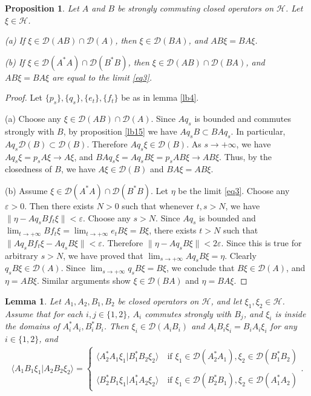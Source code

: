 \documentclass[11pt,b5paper,notitlepage]{article}
\theoremstyle{definition}
\theoremstyle{plain}
\newtheorem{pp}[df]{Proposition}
\newtheorem{lm}[df]{Lemma}
\newcommand{\mc}{\mathcal}
\newcommand{\Dom}{\scr D}
\newcommand{\bk}[1]{\langle {#1}\rangle}
\newcommand{\scr}{\mathscr}
\numberwithin{equation}{subsection}
\begin{document}
\begin{subappendices}
\begin{pp}\label{lb3}
	Let $A$ and $B$ be strongly commuting closed operators on $\mc H$. Let $\xi\in\mc H$.
	
	(a) If $\xi\in\Dom(AB)\cap\Dom(A)$, then $\xi\in\Dom(BA)$, and $AB\xi=BA\xi$.
	
	(b) If $\xi\in\Dom(A^*A)\cap\Dom(B^*B)$, then $\xi\in\Dom(AB)\cap\Dom(BA)$, and $AB\xi=BA\xi$ are equal to the limit \eqref{eq3}.
\end{pp}


\begin{proof}
	Let $\{p_s\},\{q_s\},\{e_t\},\{f_t\}$ be as in lemma \ref{lb4}. 
	
	(a) Choose any $\xi\in\Dom(AB)\cap\Dom(A)$. Since $Aq_s$ is bounded and commutes strongly with $B$, by proposition \ref{lb15} we have $Aq_sB\subset BAq_s$. In particular, $Aq_s\Dom(B)\subset\Dom(B)$. Therefore $Aq_s\xi\in\Dom(B)$. As $s\rightarrow+\infty$, we have $Aq_s\xi=p_sA\xi\rightarrow A\xi$, and $BAq_s\xi=Aq_sB\xi=p_sAB\xi\rightarrow AB\xi$. Thus, by the closedness of $B$, we have $A\xi\in\Dom(B)$ and $BA\xi=AB\xi$.
	
	(b) Assume $\xi\in\Dom(A^*A)\cap\Dom(B^*B)$. Let $\eta$ be the limit \eqref{eq3}. Choose any $\varepsilon>0$. Then there exists $N>0$ such that whenever $t,s>N$, we have  $\lVert \eta-Aq_sBf_t\xi\lVert<\varepsilon$. Choose any $s>N$. Since $Aq_s$ is bounded and $\lim_{t\rightarrow+\infty}Bf_t\xi=\lim_{t\rightarrow+\infty}e_tB\xi=B\xi$, there exists $t>N$ such that $\lVert Aq_sBf_t\xi-Aq_sB\xi\lVert<\varepsilon$. Therefore $\lVert \eta-Aq_sB\xi\lVert<2\varepsilon$. Since this is true for arbitrary $s>N$, we have proved that $\lim_{s\rightarrow+\infty}Aq_sB\xi=\eta$. Clearly $q_sB\xi\in\Dom(A)$. Since $\lim_{s\rightarrow+\infty}q_sB\xi=B\xi$, we conclude that $B\xi\in\Dom(A)$,  and $\eta=AB\xi$. Similar arguments show $\xi\in\Dom(BA)$ and $\eta=BA\xi$.
\end{proof}

\begin{lm}\label{lb14}
	Let $A_1,A_2,B_1,B_2$ be closed operators on $\mc H$, and let $\xi_1,\xi_2\in\mc H$. Assume that for each $i,j\in\{1,2\}$, $A_i$ commutes strongly with $B_j$, and  $\xi_i$ is inside the domains of $A_i^*A_i,B_i^*B_i$. Then  $\xi_i\in\Dom(A_iB_i)$ and  $A_iB_i\xi_i=B_iA_i\xi_i$ for any $i\in\{1,2\}$, and
	\begin{align}
	\bk{A_1B_1\xi_1|A_2B_2\xi_2}=\left\{ \begin{array}{ll}
	\bk{A_2^*A_1\xi_1|B_1^*B_2\xi_2}\ & \text{if }\xi_1\in\Dom(A_2^*A_1),\xi_2\in\Dom(B_1^*B_2)\\
	~&~\\
	\bk{B_2^*B_1\xi_1|A_1^*A_2\xi_2} & \text{if }\xi_1\in\Dom(B_2^*B_1),\xi_2\in\Dom(A_1^*A_2)
	\end{array}\right..\label{eq1}
	\end{align}
\end{lm}




\end{subappendices}
\end{document}
